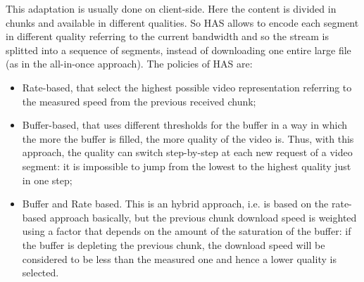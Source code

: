 \documentclass[a4paper]{report}
\begin{document}
This adaptation is usually done on client-side. Here the content is divided in chunks and available in different qualities. So HAS allows to encode each segment in different quality referring to the current bandwidth and so the stream is splitted into a sequence of segments, instead of downloading one entire large file (as in the all-in-once approach). The policies of HAS are:
\begin{itemize}
\item Rate-based, that select the highest possible video representation referring to the measured speed from the previous received chunk;
\item Buffer-based, that uses different thresholds for the buffer in a way in which the more the buffer is filled, the more quality of the video is. Thus, with this approach, the quality can switch step-by-step at each new request of a video segment: it is impossible to jump from the lowest to the highest quality just in one step;
\item Buffer and Rate based. This is an hybrid approach, i.e. is based on the rate-based approach basically, but the previous chunk download speed is weighted using a factor that depends on the amount of the saturation of the buffer: if the buffer is depleting the previous chunk, the download speed will be considered to be less than the measured one and hence a lower quality is selected. 
\end{itemize}
\end{document}
